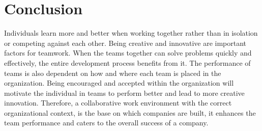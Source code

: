 \documentclass[sigplan,screen]{acmart}
\begin{document}
 \section{Conclusion}
 Individuals learn more and better when working together rather than in isolation or competing against each other. Being creative and innovative are important factors for teamwork. When the teams together can solve problems quickly and effectively, the entire development process benefits from it. The performance of teams is also dependent on how and where each team is placed in the organization. Being encouraged and accepted within the organization will motivate the individual in teams to perform better and lead to more creative innovation. Therefore, a collaborative work environment with the correct organizational context, is the base on which companies are built, it enhances the team performance and caters to the overall success of a company.



\end{document}
